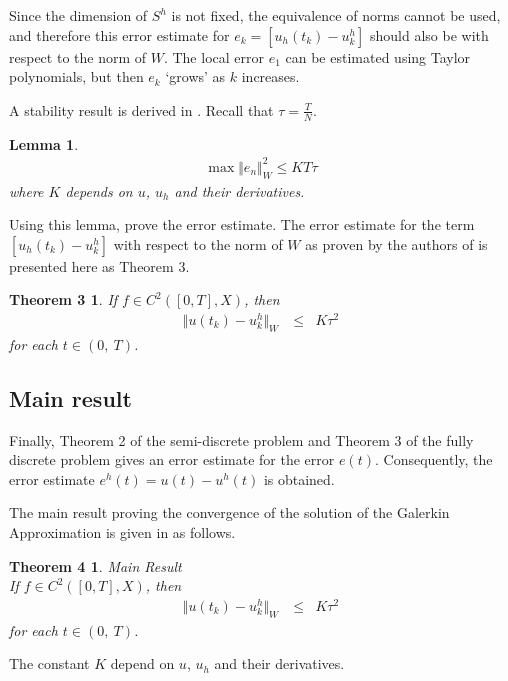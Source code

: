 \documentclass[../../main.tex]{subfiles}
\begin{document}
Since the dimension of $S^h$ is not fixed, the equivalence of norms
cannot be used, and therefore this error estimate for $e_k = [u_h(t_k) - u^h_k]$
should also be with respect to the norm of $W$. The local error $e_1$ can be estimated using Taylor polynomials, but then $e_k$ `grows' as $k$ increases.

A stability result is derived in \cite{BV13}. Recall that $\displaystyle \tau = \frac{T}{N}$.

\newtheorem*{DC_Lem3}{Lemma}
\begin{DC_Lem3}
	\begin{eqnarray*}
		\max\Vert e_{n}\Vert_{W}^{2}\leq KT\tau
	\end{eqnarray*}
	where $K$ depends on $u$, $u_h$ and their derivatives.
\end{DC_Lem3}


Using this lemma, \cite{BV13} prove the error estimate. The error estimate for the term $[u_h(t_k) - u^h_k]$ with respect to the norm of $W$ as proven by the authors of \cite{BV13} is presented here as Theorem 3.

\newtheorem*{DC_Thm5_1}{Theorem 3}
\begin{DC_Thm5_1}
	If $f\in C^{2}([0,T],X)$, then
	\begin{eqnarray*}
		\Vert u(t_{k})-u_{k}^{h}\Vert_{W}\ & \leq & K\tau^2
	\end{eqnarray*}
	for each $t\in(0,\ T)$.
\end{DC_Thm5_1}

\subsection{Main result}
Finally, Theorem 2 of the semi-discrete problem and Theorem 3 of the fully
discrete problem gives an error estimate for the error $e(t)$. Consequently,
the error estimate $e^h(t) = u(t) - u^h(t)$ is obtained.

The main result proving the convergence of the solution of the Galerkin
Approximation is given in \cite{BV13} as follows.
\newtheorem*{DC_Thm5}{Theorem 4}
\begin{DC_Thm5}
	{Main Result}\\
	If $f\in C^{2}([0,T],X)$, then
	\begin{eqnarray*}
		\Vert u(t_{k})-u_{k}^{h}\Vert_{W}\ & \leq & K\tau^2
	\end{eqnarray*}
	for each $t\in(0,\ T)$.
\end{DC_Thm5}

The constant $K$ depend on $u$, $u_h$ and their derivatives.
\end{document}
